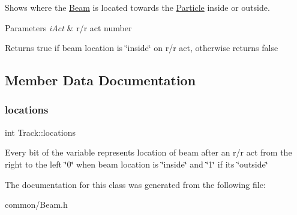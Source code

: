 Shows where the \mbox{\hyperlink{class_beam}{Beam}} is located towards the \mbox{\hyperlink{class_particle}{Particle}} inside or outside. 


\begin{DoxyParams}{Parameters}
{\em i\+Act} & r/r act number \\
\hline
\end{DoxyParams}
\begin{DoxyReturn}{Returns}
true if beam location is \char`\"{}inside\char`\"{} on r/r act, otherwise returns false 
\end{DoxyReturn}


\subsection{Member Data Documentation}
\mbox{\label{class_track_a9a1bcdb52e5765ac6d91e62f26a51df0}} 
\subsubsection{\texorpdfstring{locations}{locations}}
{\footnotesize\ttfamily int Track\+::locations}

Every bit of the variable represents location of beam after an r/r act from the right to the left \char`\"{}0\char`\"{} when beam location is \char`\"{}inside\char`\"{} and \char`\"{}1\char`\"{} if it\textquotesingle{}s \char`\"{}outside\char`\"{} 

The documentation for this class was generated from the following file\+:\begin{DoxyCompactItemize}
\item 
common/Beam.\+h\end{DoxyCompactItemize}

